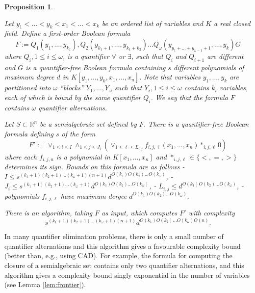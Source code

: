 \documentclass[
]{book}
\newtheorem{proposition}{Proposition}[chapter]
\theoremstyle{definition}
\theoremstyle{definition}
\theoremstyle{definition}
\theoremstyle{definition}
\theoremstyle{remark}
\begin{document}
\begin{proposition}
\protect\hypertarget{prp:bpr-qe}{}\label{prp:bpr-qe}\citep[Algorithm 14.21]{bpr2006}

Let \(y_1 < \ldots < y_k < x_1 < \ldots < x_k\) be an ordered list of variables and \(K\) a real closed field. Define a first-order Boolean formula
\[
F := Q_1 (y_1,\ldots,y_{k_1}), Q_2 (y_{k_1 + 1},\ldots,y_{k_1 + k_2}) \ldots Q_\omega (y_{y_1 + \ldots + y_{\omega-1} + 1},\ldots, y_k) G
\]
where \(Q_i, 1\le i \le \omega\), is a quantifier \(\forall\) or \(\exists\), such that \(Q_i\) and \(Q_{i+1}\) are different and \(G\) is a quantifier-free Boolean formula containing \(s\) different polynomials of maximum degree \(d\) in \(K[y_1,\ldots,y_k,x_1,\ldots,x_n]\).
Note that variables \(y_1,\ldots,y_k\) are partitioned into \(\omega\) ``blocks'' \(Y_1,\ldots,Y_\omega\) such that \(Y_i, 1 \le i \le \omega\) contains \(k_i\) variables, each of which is bound by the same quantifier \(Q_i\).
We say that the formula \(F\) contains \(\omega\) quantifier alternations.

Let \(S \subset \mathbb{R}^n\) be a semialgebraic set defined by \(F\). There is a quantifier-free Boolean formula defining \(s\) of the form
\[
F' := \lor_{1 \le i \le I} \land_{1 \le j \le J_i} \left( \lor_{1 \le \ell \le L_{i,j}} f_{i,j,\ell}(x_1,\ldots,x_n) \ast_{i,j,\ell} 0 \right)
\]
where each \(f_{i,j,n}\) is a polynomial in \(K[x_1,\ldots,x_n]\) and \(\ast_{i,j,\ell} \in \{<, =, >\}\) determines its sign.
Bounds on this formula are as follows
- \(I \le s^{(k_1 + 1)(k_2 + 1) \ldots (k_\omega + 1)(n+1)}d^{O(k_1) O(k_2) \ldots O(k_\omega)}\),
- \(J_i \le s^{(k_1 + 1)(k_2 + 1) \ldots (k_\omega + 1)}d^{O(k_1) O(k_2) \ldots O(k_\omega)}\),
- \(L_{i,j} \le d^{O(k_1) O(k_2) \ldots O(k_\omega)}\),
- polynomials \(f_{i,j,\ell}\) have maximum dergee \(d^{O(k_1) O(k_2) \ldots O(k_\omega)}\).

There is an algorithm, taking \(F\) as input, which computes \(F'\) with complexity
\[
s^{(k_1 + 1)(k_2 + 1) \ldots (k_\omega + 1)(n+1)}d^{O(k_1) O(k_2) \ldots O(k_\omega)O(n)}.
\]
\end{proposition}

In many quantifier elimination problems, there is only a small number of quantifier alternations and this algorithm gives a favourable complexity bound (better than, e.g., using CAD). For example, the formula for computing the closure of a semialgebraic set contains only two quantifier alternations, and this algorithm gives a complexity bound singly exponential in the number of variables (see Lemma \ref{lem:frontier}).
\end{document}
